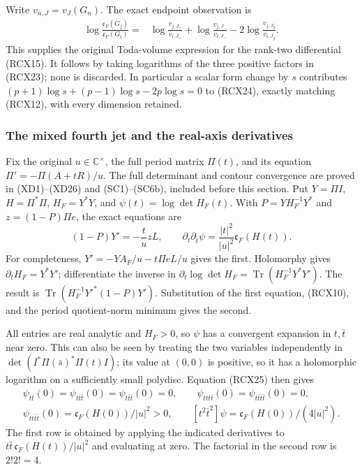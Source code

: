 Write \(v_{n,J}=v_J(G_n)\). The exact endpoint observation is
\[
\begin{split}
 \log\frac{\mathfrak c_F(G_j)}{\mathfrak c_F(G_i)}
  ={}&\log\frac{v_{j,J_+}}{v_{i,J_+}}
     +\log\frac{v_{j,J_-}}{v_{i,J_-}}
     -2\log\frac{v_{j,J_g}}{v_{i,J_g}} .
\end{split}\tag{RCX24}
\]
This supplies the original Toda-volume expression for the
rank-two differential (RCX15). It follows by taking logarithms of
the three positive factors in (RCX23); none is discarded.
In particular a scalar form change by \(s\) contributes
\((p+1)\log s+(p-1)\log s-2p\log s=0\) to (RCX24),
exactly matching (RCX12), with every dimension retained.

\subsubsection{The mixed fourth jet and the real-axis derivatives}

Fix the original \(u\in\mathbb C^\times\), the full period matrix
\(\Pi(t)\), and its equation \(\Pi'=-\Pi(A+tR)/u\).
The full determinant and contour convergence are proved in
(XD1)--(XD26) and (SC1)--(SC6b), included before this section.
Put \(Y=\Pi I\), \(H=\Pi^*\Pi\), \(H_F=Y^*Y\), and
\(\psi(t)=\log\det H_F(t)\). With
\(P=YH_F^{-1}Y^*\) and \(z=(1-P)\Pi e\), the exact equations are
\[
 (1-P)Y'=-\frac t u zL,\qquad
 \partial_t\partial_{\bar t}\psi
      =\frac{|t|^2}{|u|^2}\mathfrak c_F(H(t)).
 \tag{RCX25}
\]
For completeness, \(Y'=-YA_F/u-t\Pi eL/u\) gives the first.
Holomorphy gives \(\partial_tH_F=Y^*Y'\);
differentiate the inverse in
\(\partial_t\log\det H_F=\operatorname{Tr}(H_F^{-1}Y^*Y')\).
The result is
\(\operatorname{Tr}(H_F^{-1}Y'^*(1-P)Y')\).
Substitution of the first equation, (RCX10), and the period
quotient-norm minimum gives the second.

All entries are real analytic and \(H_F>0\), so \(\psi\) has a
convergent expansion in \(t,\bar t\) near zero. This can also
be seen by treating the two variables independently in
\(\det(I^*\Pi(\bar s)^*\Pi(t)I)\); its value at \((0,0)\)
is positive, so it has a holomorphic logarithm on a sufficiently
small polydisc. Equation (RCX25) then gives
\[
\begin{gathered}
 \psi_{t\bar t}(0)=\psi_{tt\bar t}(0)
  =\psi_{t\bar t\bar t}(0)=0,\qquad
 \psi_{ttt\bar t}(0)=\psi_{t\bar t\bar t\bar t}(0)=0,\\
 \boxed{\psi_{tt\bar t\bar t}(0)
       =\mathfrak c_F(H(0))/|u|^2>0,\qquad
 [t^2\bar t^2]\psi=\mathfrak c_F(H(0))/(4|u|^2).}
\end{gathered}\tag{RCX26}
\]
The first row is obtained by applying the indicated derivatives
to \(t\bar t\,\mathfrak c_F(H(t))/|u|^2\) and evaluating at zero.
The factorial in the second row is \(2!2!=4\).

